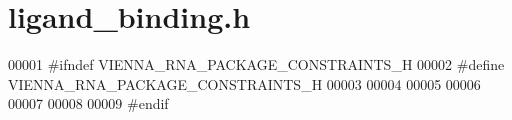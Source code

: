 \hypertarget{ligand__binding_8h_source}{}\section{ligand\+\_\+binding.\+h}
\label{ligand__binding_8h_source}

\begin{DoxyCode}
00001 \textcolor{preprocessor}{#ifndef VIENNA\_RNA\_PACKAGE\_CONSTRAINTS\_H}
00002 \textcolor{preprocessor}{#define VIENNA\_RNA\_PACKAGE\_CONSTRAINTS\_H}
00003 
00004 
00005 
00006 
00007 
00008 
00009 \textcolor{preprocessor}{#endif}
\end{DoxyCode}
